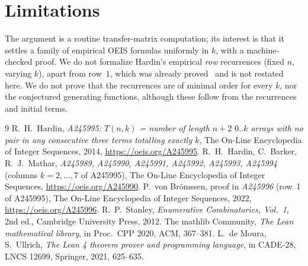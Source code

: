 \documentclass[11pt]{article}
\theoremstyle{remark}\newtheorem{remark}[theorem]{Remark}
\begin{document}
\section{Limitations}
The argument is a routine transfer-matrix computation; its interest is that it settles a family of empirical OEIS formulas uniformly in $k$, with a machine-checked proof. We do not formalize Hardin's empirical \emph{row} recurrences (fixed $n$, varying $k$), apart from row~$1$, which was already proved~\cite{row1} and is not restated here. We do not prove that the recurrences are of minimal order for every $k$, nor the conjectured generating functions, although these follow from the recurrences and initial terms.

\begin{thebibliography}{9}
 R.~H.~Hardin, \emph{A245995: $T(n,k)$ = number of length $n+2$ $0..k$ arrays with no pair in any consecutive three terms totalling exactly $k$}, The On-Line Encyclopedia of Integer Sequences, 2014, \url{https://oeis.org/A245995}.
 R.~H.~Hardin, C.~Barker, R.~J.~Mathar, \emph{A245989, A245990, A245991, A245992, A245993, A245994} (columns $k=2,\dots,7$ of A245995), The On-Line Encyclopedia of Integer Sequences, \url{https://oeis.org/A245990}.
 P.~von Br\"omssen, proof in \emph{A245996} (row~1 of A245995), The On-Line Encyclopedia of Integer Sequences, 2022, \url{https://oeis.org/A245996}.
 R.~P.~Stanley, \emph{Enumerative Combinatorics, Vol.~1}, 2nd ed., Cambridge University Press, 2012.
 The mathlib Community, \emph{The Lean mathematical library}, in Proc.\ CPP 2020, ACM, 367--381.
 L.~de Moura, S.~Ullrich, \emph{The Lean 4 theorem prover and programming language}, in CADE-28, LNCS 12699, Springer, 2021, 625--635.
\end{thebibliography}
\end{document}
